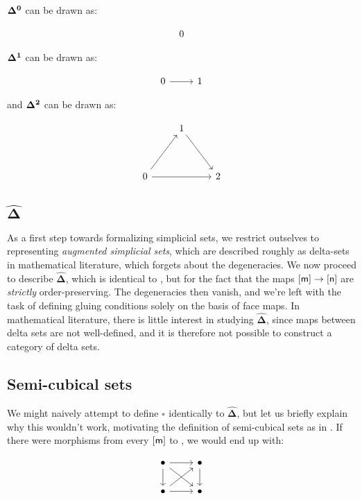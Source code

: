 \documentclass[10pt]{art}
\newcommand{\DeltaHat}{\ensuremath{\hat{\boldsymbol{\Delta}}}}
\newcommand{\Cube}[1]{\ensuremath{\boldsymbol{\square^{#1}}}}
\begin{document}
\begin{example}
  $\boldsymbol{\Delta^{0}}$ can be drawn as:

  $$
    \begin{tikzcd}
      0
    \end{tikzcd}
  $$

  $\boldsymbol{\Delta^{1}}$ can be drawn as:

  $$
    \begin{tikzcd}
      0 \arrow[r] & 1
    \end{tikzcd}
  $$

  and $\boldsymbol{\Delta^{2}}$ can be drawn as:

  $$
    \begin{tikzcd}
      & 1 \arrow[ddr] & \\
      \\
      0 \arrow[uur] \arrow[rr] & & 2
    \end{tikzcd}
  $$
\end{example}

\subsection{\texorpdfstring{\DeltaHat}{Delta sets}}
As a first step towards formalizing simplicial sets, we restrict outselves to representing \emph{augmented simplicial sets}, which are described roughly as delta-sets in mathematical literature, which forgets about the degeneracies. We now proceed to describe \DeltaHat, which is identical to \Simplex{}, but for the fact that the maps $\mathsf{[m]} \rightarrow \mathsf{[n]}$ are \emph{strictly} order-preserving. The degeneracies then vanish, and we're left with the task of defining gluing conditions solely on the basis of face maps. In mathematical literature, there is little interest in studying \DeltaHat, since maps between delta sets are not well-defined, and it is therefore not possible to construct a category of delta sets.

\subsection{Semi-cubical sets}
We might naively attempt to define $\Cube{}$ identically to \DeltaHat, but let us briefly explain why this wouldn't work, motivating the definition of semi-cubical sets as in \cite{Antolini00}. If there were morphisms from every $\mathsf{[m]}$ to , we would end up with:

$$
  \begin{tikzcd}
    \bullet \arrow[r] \arrow[dr] \arrow[d] & \bullet \arrow[d] \\
    \bullet \arrow[r] \arrow[ur] & \bullet
  \end{tikzcd}
$$
\end{document}
